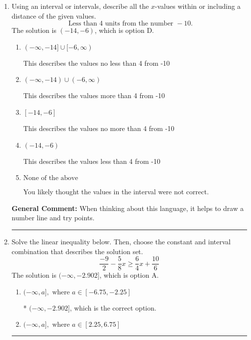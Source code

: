 \documentclass{extbook}[14pt]
\newcommand{\litem}[1]{\item #1

\rule{\textwidth}{0.4pt}}
\begin{document}
\begin{enumerate}
{\begin{enumerate}[label=\Alph*.]
$(-\infty, 2.50) \cup [-4.00, \infty)$, which corresponds to displaying the and-inequality as an or-inequality AND flipping the inequality AND getting negatives of the actual endpoints.
\item \( \text{None of the above.} \)

* This is correct as the answer should be $[-2.50, 4.00)$.
\end{enumerate}

\textbf{General Comment:} To solve, you will need to break up the compound inequality into two inequalities. Be sure to keep track of the inequality! It may be best to draw a number line and graph your solution.
}
\litem{
Using an interval or intervals, describe all the $x$-values within or including a distance of the given values.
\[ \text{ Less than } 4 \text{ units from the number } -10. \]The solution is \( (-14, -6) \), which is option D.\begin{enumerate}[label=\Alph*.]
\item \( (-\infty, -14] \cup [-6, \infty) \)

This describes the values no less than 4 from -10
\item \( (-\infty, -14) \cup (-6, \infty) \)

This describes the values more than 4 from -10
\item \( [-14, -6] \)

This describes the values no more than 4 from -10
\item \( (-14, -6) \)

This describes the values less than 4 from -10
\item \( \text{None of the above} \)

You likely thought the values in the interval were not correct.
\end{enumerate}

\textbf{General Comment:} When thinking about this language, it helps to draw a number line and try points.
}
\litem{
Solve the linear inequality below. Then, choose the constant and interval combination that describes the solution set.
\[ \frac{-9}{2} - \frac{5}{8} x \geq \frac{6}{4} x + \frac{10}{6} \]The solution is \( (-\infty, -2.902] \), which is option A.\begin{enumerate}[label=\Alph*.]
\item \( (-\infty, a], \text{ where } a \in [-6.75, -2.25] \)

* $(-\infty, -2.902]$, which is the correct option.
\item \( (-\infty, a], \text{ where } a \in [2.25, 6.75] \)


\end{enumerate}}
\end{enumerate}
\end{document}

